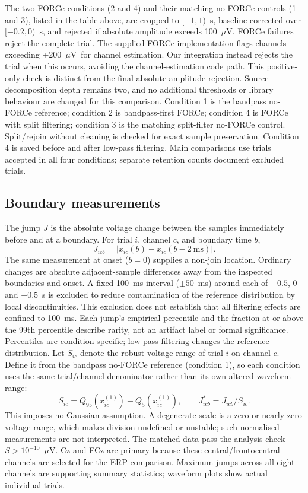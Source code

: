 \documentclass[11pt,a4paper]{article}
\newcommand{\uv}{\ensuremath{\mu\mathrm{V}}}
\begin{document}
The two FORCe conditions (2 and 4) and their matching no-FORCe controls (1 and 3), listed in the table above, are cropped to $[-1,1)$~s, baseline-corrected over $[-0.2,0)$~s, and rejected if absolute amplitude exceeds 100~\uv. FORCe failures reject the complete trial. The supplied FORCe implementation flags channels exceeding +200~\uv\ for channel estimation. Our integration instead rejects the trial when this occurs, avoiding the channel-estimation code path. This positive-only check is distinct from the final absolute-amplitude rejection. Source decomposition depth remains two, and no additional thresholds or library behaviour are changed for this comparison.
Condition 1 is the bandpass no-FORCe reference; condition 2 is bandpass-first FORCe; condition 4 is FORCe with split filtering; condition 3 is the matching split-filter no-FORCe control. Split/rejoin without cleaning is checked for exact sample preservation. Condition 4 is saved before and after low-pass filtering. Main comparisons use trials accepted in all four conditions; separate retention counts document excluded trials.
\subsection{Boundary measurements}
The jump $J$ is the absolute voltage change between the samples immediately before and at a boundary. For trial $i$, channel $c$, and boundary time $b$,
\[
J_{icb}=|x_{ic}(b)-x_{ic}(b-2~\mathrm{ms})|.
\]
The same measurement at onset ($b=0$) supplies a non-join location. Ordinary changes are absolute adjacent-sample differences away from the inspected boundaries and onset. A fixed 100~ms interval ($\pm50$~ms) around each of $-0.5$, 0 and $+0.5$~s is excluded to reduce contamination of the reference distribution by local discontinuities. This exclusion does not establish that all filtering effects are confined to 100~ms. Each jump's empirical percentile and the fraction at or above the 99th percentile describe rarity, not an artifact label or formal significance. Percentiles are condition-specific; low-pass filtering changes the reference distribution.
Let $S_{ic}$ denote the robust voltage range of trial $i$ on channel $c$. Define it from the bandpass no-FORCe reference (condition 1), so each condition uses the same trial/channel denominator rather than its own altered waveform range:
\[
S_{ic}=Q_{95}(x^{(1)}_{ic})-Q_{5}(x^{(1)}_{ic}),\qquad J^*_{icb}=J_{icb}/S_{ic}.
\]
This imposes no Gaussian assumption. A degenerate scale is a zero or nearly zero voltage range, which makes division undefined or unstable; such normalised measurements are not interpreted. The matched data pass the analysis check $S>10^{-10}$~\uv. Cz and FCz are primary because these central/frontocentral channels are selected for the ERP comparison. Maximum jumps across all eight channels are supporting summary statistics; waveform plots show actual individual trials.
\end{document}
